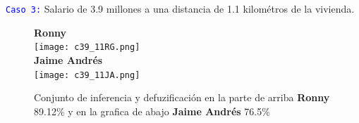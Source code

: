 \documentclass[10pt,onecolumn,twoside,letterpaper]{article}
\newcommand{\myreferences}{../../../doc/review/review/library}
\begin{document}
\par \textcolor{blue}{\texttt{Caso 3:}} Salario de 3.9 millones a una distancia de 1.1 kilom\'etros de la vivienda. 
\begin{figure}[H]
  \centering
  \textbf{Ronny}\\
  \texttt{[image: c39\_11RG.png]}\\
  \textbf{Jaime Andr\'es}\\
  \texttt{[image: c39\_11JA.png]}\\
  \caption{\small Conjunto de inferencia y defuzificaci\'on en la parte de arriba \textbf{Ronny} 89.12\% y en la grafica de abajo \textbf{Jaime Andr\'es} 76.5\%}
  \label{fig:UnivC}
\end{figure}



\end{document}
